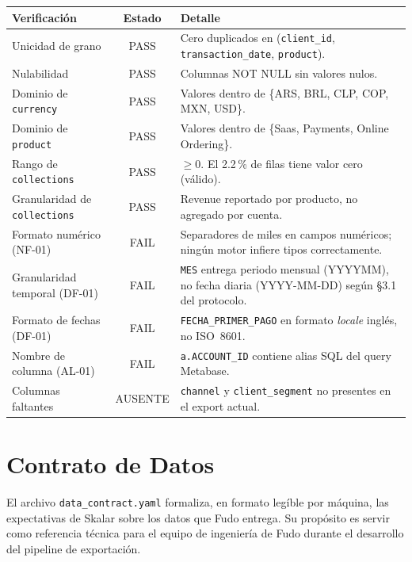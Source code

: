 \documentclass[11pt,a4paper]{article}
\newcommand{\code}[1]{\texttt{#1}}
\newcommand{\field}[1]{\texttt{#1}}
\begin{document}
\begin{tabularx}{\textwidth}{l c X}
\toprule
\textbf{Verificaci\'on} & \textbf{Estado} & \textbf{Detalle} \\
\midrule
Unicidad de grano & PASS &
  Cero duplicados en (\field{client\_id}, \field{transaction\_date},
  \field{product}). \\[4pt]
Nulabilidad & PASS &
  Columnas NOT NULL sin valores nulos. \\[4pt]
Dominio de \field{currency} & PASS &
  Valores dentro de \{ARS, BRL, CLP, COP, MXN, USD\}. \\[4pt]
Dominio de \field{product} & PASS &
  Valores dentro de \{Saas, Payments, Online Ordering\}. \\[4pt]
Rango de \field{collections} & PASS &
  $\geq 0$. El 2.2\,\% de filas tiene valor cero (v\'alido). \\[4pt]
Granularidad de \field{collections} & PASS &
  Revenue reportado por producto, no agregado por cuenta. \\[4pt]
\midrule
Formato num\'erico (NF-01) & FAIL &
  Separadores de miles en campos num\'ericos; ning\'un motor
  infiere tipos correctamente. \\[4pt]
Granularidad temporal (DF-01) & FAIL &
  \field{MES} entrega periodo mensual (YYYYMM), no fecha diaria
  (YYYY-MM-DD) seg\'un \S3.1 del protocolo. \\[4pt]
Formato de fechas (DF-01) & FAIL &
  \field{FECHA\_PRIMER\_PAGO} en formato \textit{locale}
  ingl\'es, no ISO~8601. \\[4pt]
Nombre de columna (AL-01) & FAIL &
  \field{a.ACCOUNT\_ID} contiene alias SQL del query Metabase. \\[4pt]
Columnas faltantes & AUSENTE &
  \field{channel} y \field{client\_segment} no presentes en el
  export actual. \\
\bottomrule
\end{tabularx}

\section{Contrato de Datos}

El archivo \code{data\_contract.yaml} formaliza, en formato leg\'ible por
m\'aquina, las expectativas de Skalar sobre los datos que Fudo entrega.
Su prop\'osito es servir como referencia t\'ecnica para el equipo de
ingenier\'ia de Fudo durante el desarrollo del pipeline de exportaci\'on.
\end{document}
